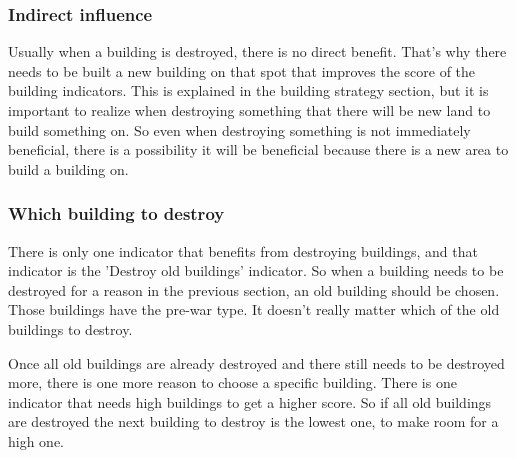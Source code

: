 \subsubsection{Indirect influence}
Usually when a building is destroyed, there is no direct benefit. That's why there needs to be built a new building on that spot that improves the score of the building indicators. This is explained in the building strategy section, but it is important to realize when destroying something that there will be new land to build something on. So even when destroying something is not immediately beneficial, there is a possibility it will be beneficial because there is a new area to build a building on.

\subsubsection{Which building to destroy}
There is only one indicator that benefits from destroying buildings, and that indicator is the 'Destroy old buildings' indicator. So when a building needs to be destroyed for a reason in the previous section, an old building should be chosen. Those buildings have the pre-war type. It doesn't really matter which of the old buildings to destroy. 

Once all old buildings are already destroyed and there still needs to be destroyed more, there is one more reason to choose a specific building. There is one indicator that needs high buildings to get a higher score. So if all old buildings are destroyed the next building to destroy is the lowest one, to make room for a high one.

